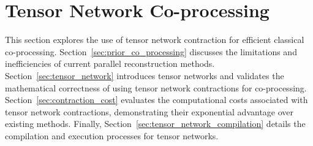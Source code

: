 \section{Tensor Network Co-processing}\label{sec:co_processing}
This section explores the use of tensor network contraction for efficient classical co-processing.
Section~\ref{sec:prior_co_processing} discusses the limitations and inefficiencies of current parallel reconstruction methods.
Section~\ref{sec:tensor_network} introduces tensor networks and validates the mathematical correctness of using tensor network contractions for co-processing.
Section~\ref{sec:contraction_cost} evaluates the computational costs associated with tensor network contractions, demonstrating their exponential advantage over existing methods. 
Finally, Section~\ref{sec:tensor_network_compilation} details the compilation and execution processes for tensor networks.



